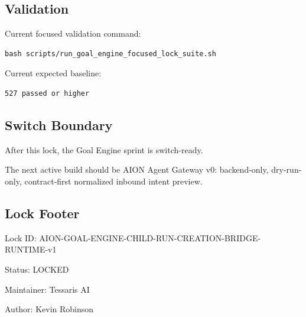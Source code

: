 \subsection{Validation}

Current focused validation command:

\begin{verbatim}
bash scripts/run_goal_engine_focused_lock_suite.sh
\end{verbatim}

Current expected baseline:

\begin{verbatim}
527 passed or higher
\end{verbatim}

\subsection{Switch Boundary}

After this lock, the Goal Engine sprint is switch-ready.

The next active build should be AION Agent Gateway v0: backend-only, dry-run-only, contract-first normalized inbound intent preview.

\subsection{Lock Footer}

Lock ID: AION-GOAL-ENGINE-CHILD-RUN-CREATION-BRIDGE-RUNTIME-v1

Status: LOCKED

Maintainer: Tessaris AI

Author: Kevin Robinson
